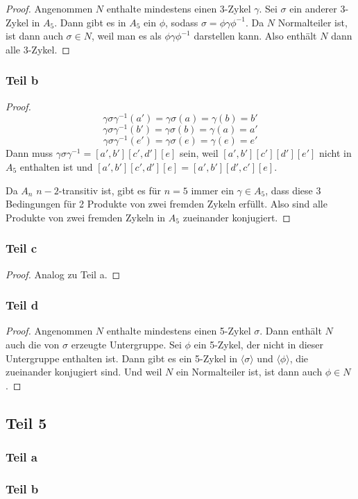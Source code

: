 \documentclass[10pt,a4paper]{article}
\begin{document}
\begin{proof}
  Angenommen $N$ enthalte mindestens einen 3-Zykel $\gamma$.
  Sei $\sigma$ ein anderer 3-Zykel in $A_{5}$.
  Dann gibt es in $A_{5}$ ein $\phi$, sodass $\sigma = \phi\gamma\phi^{-1}$.
  Da $N$ Normalteiler ist, ist dann auch $\sigma \in N$, weil man es als $\phi\gamma\phi^{-1}$ darstellen kann.
  Also enthält $N$ dann alle 3-Zykel.
\end{proof}

\subsubsection{Teil b}

\begin{proof}
  \begin{equation}
    \gamma\sigma\gamma^{-1}(a') = \gamma\sigma(a) = \gamma(b) = b'
  \end{equation}
  \begin{equation}
    \gamma\sigma\gamma^{-1}(b') = \gamma\sigma(b) = \gamma(a) = a'
  \end{equation}
  \begin{equation}
    \gamma\sigma\gamma^{-1}(e') = \gamma\sigma(e) = \gamma(e) = e'
  \end{equation}
  Dann muss $\gamma\sigma\gamma^{-1} = [a', b'][c', d'][e]$ sein, weil $[a', b'][c'][d'][e']$ nicht in $A_{5}$ enthalten ist und $[a', b'][c', d'][e] = [a', b'][d', c'][e]$.

  Da $A_{n}$ $n - 2$-transitiv ist, gibt es für $n = 5$ immer ein $\gamma \in A_{5}$, dass diese 3 Bedingungen für 2 Produkte von zwei fremden Zykeln erfüllt.
  Also sind alle Produkte von zwei fremden Zykeln in $A_{5}$ zueinander konjugiert.
\end{proof}

\subsubsection{Teil c}

\begin{proof}
  Analog zu Teil a.
\end{proof}

\subsubsection{Teil d}

\begin{proof}
  Angenommen $N$ enthalte mindestens einen 5-Zykel $\sigma$.
  Dann enthält $N$ auch die von $\sigma$ erzeugte Untergruppe.
  Sei $\phi$ ein 5-Zykel, der nicht in dieser Untergruppe enthalten ist.
  Dann gibt es ein 5-Zykel in $\langle \sigma \rangle$ und $\langle \phi \rangle$, die zueinander konjugiert sind.
  Und weil $N$ ein Normalteiler ist, ist dann auch $\phi \in N$.
\end{proof}

\subsection{Teil 5}

\subsubsection{Teil a}

\subsubsection{Teil b}
\end{document}
